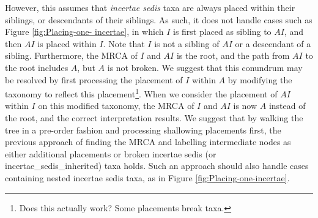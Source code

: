\documentclass[english]{article}
\begin{document}
However, this assumes that \emph{incertae sedis} taxa are always
placed within their siblings, or descendants of their siblings. As
such, it does not handle cases such as Figure \ref{fig:Placing-one-
incertae}, in which $I$ is first placed as sibling to $AI$, and then
$AI$ is placed within $I$. Note that $I$ is not a sibling of $AI$ or a
descendant of a sibling. Furthermore, the MRCA of $I$ and $AI$ is the
root, and the path from $AI$ to the root includes $A$, but $A$ is not
broken. We suggest that this conundrum may be resolved by first
processing the placement of $I$ within $A$ by modifying the taxonomy
to reflect this placement\footnote{Does this actually work? Some
placements break taxa.}. When we consider the placement of $AI$ within
$I$ on this modified taxonomy, the MRCA of $I$ and $AI$ is now $A$
instead of the root, and the correct interpretation results. We
suggest that by walking the tree in a pre-order fashion and processing
shallowing placements first, the previous approach of finding the MRCA
and labelling intermediate nodes as either additional placements or
broken incertae sedis (or incertae\_sedis\_inherited) taxa holds. Such
an approach should also handle cases containing nested incertae sedis
taxa, as in Figure \ref{fig:Placing-one-incertae}.

\end{document}
